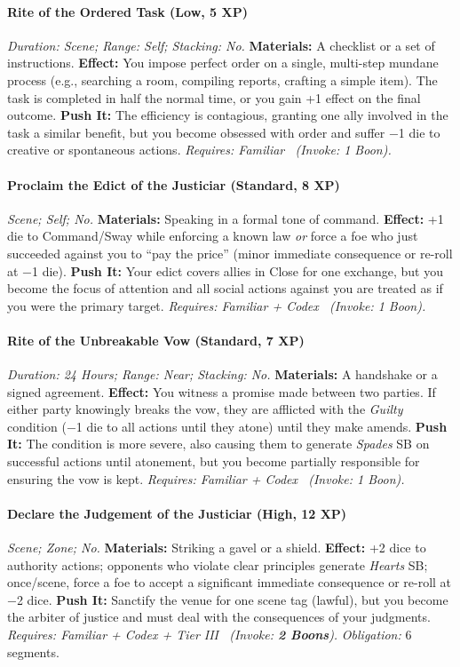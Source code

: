 \paragraph{Rite of the Ordered Task (Low, 5 XP)} \emph{Duration: Scene; Range: Self; Stacking: No.}
\textbf{Materials:} A checklist or a set of instructions.
\textbf{Effect:} You impose perfect order on a single, multi-step mundane process (e.g., searching a room, compiling reports, crafting a simple item). The task is completed in half the normal time, or you gain +1 effect on the final outcome.
\textbf{Push It:} The efficiency is contagious, granting one ally involved in the task a similar benefit, but you become obsessed with order and suffer −1 die to creative or spontaneous actions.
\emph{Requires: Familiar \ (\textit{Invoke:} 1 Boon).}
\paragraph{Proclaim the Edict of the Justiciar (Standard, 8 XP)} \emph{Scene; Self; No.}
\textbf{Materials:} Speaking in a formal tone of command.
\textbf{Effect:} +1 die to Command/Sway while enforcing a known law \emph{or} force a foe who just succeeded against you to ``pay the price'' (minor immediate consequence or re-roll at −1 die).
\textbf{Push It:} Your edict covers allies in Close for one exchange, but you become the focus of attention and all social actions against you are treated as if you were the primary target.
\emph{Requires: Familiar + Codex \ (\textit{Invoke:} 1 Boon).}
\paragraph{Rite of the Unbreakable Vow (Standard, 7 XP)} \emph{Duration: 24 Hours; Range: Near; Stacking: No.}
\textbf{Materials:} A handshake or a signed agreement.
\textbf{Effect:} You witness a promise made between two parties. If either party knowingly breaks the vow, they are afflicted with the \emph{Guilty} condition (−1 die to all actions until they atone) until they make amends.
\textbf{Push It:} The condition is more severe, also causing them to generate \emph{Spades} SB on successful actions until atonement, but you become partially responsible for ensuring the vow is kept.
\emph{Requires: Familiar + Codex \ (\textit{Invoke:} 1 Boon).}
\paragraph{Declare the Judgement of the Justiciar (High, 12 XP)} \emph{Scene; Zone; No.}
\textbf{Materials:} Striking a gavel or a shield.
\textbf{Effect:} +2 dice to authority actions; opponents who violate clear principles generate \emph{Hearts} SB; once/scene, force a foe to accept a significant immediate consequence or re-roll at −2 dice.
\textbf{Push It:} Sanctify the venue for one scene tag (lawful), but you become the arbiter of justice and must deal with the consequences of your judgments.
\emph{Requires: Familiar + Codex + Tier III \ (\textit{Invoke:} \textbf{2 Boons}).}
\emph{Obligation:} 6 segments.

